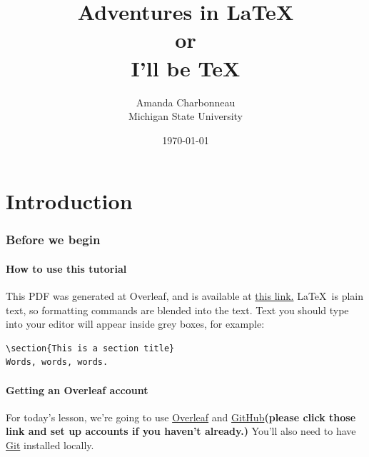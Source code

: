 \documentclass[12pt]{article}
\begin{document}
\newcommand{\DoIT}[1]{\textsf{#1}}
\newcommand{\word}[1]{\textsl{#1}}
\begin{titlepage}

\title{Adventures in \LaTeX \\or\\I'll be \TeX}
\author{Amanda Charbonneau\\
		Michigan State University}
\date{\today}
\maketitle

\end{titlepage}

\tableofcontents
\part{Introduction}
\section{Before we begin}

\subsection{How to use this tutorial}

This PDF was generated at Overleaf, and is available at \href{https://www.overleaf.com/read/bybtmqkkmpdk}{this link.}
\LaTeX ~is plain text, so formatting commands are blended into the text. Text you should type into your editor will appear inside grey boxes, for example:

\begin{lstlisting}
\section{This is a section title}
Words, words, words.
\end{lstlisting}

\subsection{Getting an Overleaf account}
For today's lesson, we're going to use \href{http://www.Overleaf.com}{Overleaf} and \href{http://www.github.com}{GitHub}\textbf{(please click those link and set up accounts if you haven't already.)} You'll also need to have \href{https://git-scm.com/book/en/v2/Getting-Started-Installing-Git}{Git} installed locally.\\ 
\end{document}
